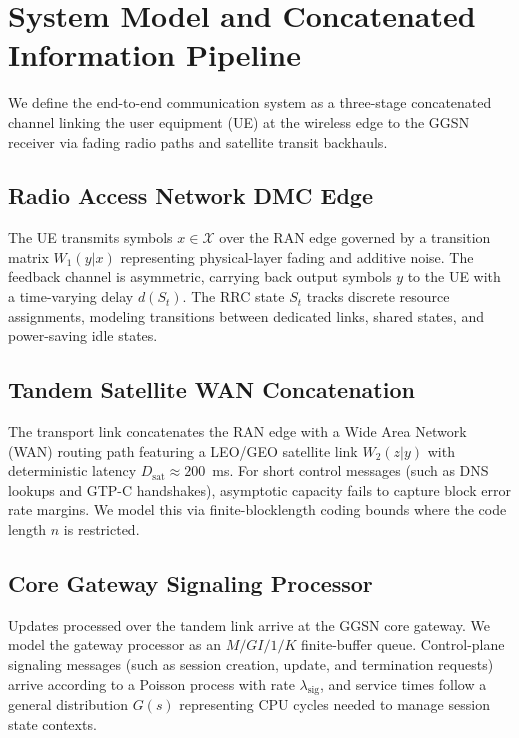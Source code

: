 \documentclass[journal]{IEEEtran}
\begin{document}
\section{System Model and Concatenated Information Pipeline}
We define the end-to-end communication system as a three-stage concatenated channel linking the user equipment (UE) at the wireless edge to the GGSN receiver via fading radio paths and satellite transit backhauls. 

\subsection{Radio Access Network DMC Edge}
The UE transmits symbols $x \in \mathcal{X}$ over the RAN edge governed by a transition matrix $W_1(y|x)$ representing physical-layer fading and additive noise. The feedback channel is asymmetric, carrying back output symbols $y$ to the UE with a time-varying delay $d(S_t)$. The RRC state $S_t$ tracks discrete resource assignments, modeling transitions between dedicated links, shared states, and power-saving idle states.

\subsection{Tandem Satellite WAN Concatenation}
The transport link concatenates the RAN edge with a Wide Area Network (WAN) routing path featuring a LEO/GEO satellite link $W_2(z|y)$ with deterministic latency $D_{\text{sat}} \approx 200$~ms. For short control messages (such as DNS lookups and GTP-C handshakes), asymptotic capacity fails to capture block error rate margins. We model this via finite-blocklength coding bounds where the code length $n$ is restricted.

\subsection{Core Gateway Signaling Processor}
Updates processed over the tandem link arrive at the GGSN core gateway. We model the gateway processor as an $M/GI/1/K$ finite-buffer queue. Control-plane signaling messages (such as session creation, update, and termination requests) arrive according to a Poisson process with rate $\lambda_{\text{sig}}$, and service times follow a general distribution $G(s)$ representing CPU cycles needed to manage session state contexts.
\end{document}
